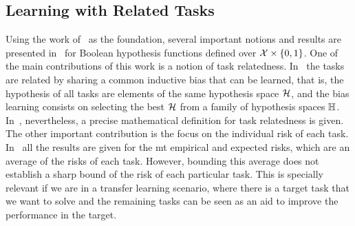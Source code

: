 
\subsection{Learning with Related Tasks} %
Using the work of~\cite{baxter2000model} as the foundation, several important notions and results are presented in~\cite{Ben-DavidB08} for Boolean hypothesis functions defined over $\mathcal{X} \times \left\{0, 1\right\}$.
One of the main contributions of this work is a notion of task relatedness. In~\cite{baxter2000model} the tasks are related by sharing a common inductive bias that can be learned, that is, the hypothesis of all tasks are elements of the same hypothesis space $\mathcal{H}$, and the bias learning consists on selecting the best $\mathcal{H}$ from a family of hypothesis spaces $\mathbb{H}$. In~\cite{Ben-DavidB08}, nevertheless, a precise mathematical definition for task relatedness is given.
The other important contribution is the focus on the individual risk of each task. In~\cite{baxter2000model} all the results are given for the \acrshort{mt} empirical and expected risks, which are an average of the risks of each task. However, bounding this average does not establish a sharp bound of the risk of each particular task. This is specially relevant if we are in a transfer learning scenario, where there is a target task that we want to solve and the remaining tasks can be seen as an aid to improve the performance in the target.

